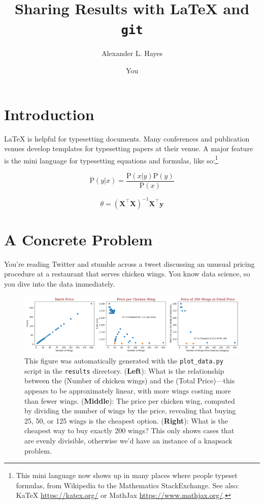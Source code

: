 \documentclass{article}
\title{Sharing Results with \LaTeX{} and \texttt{git}}
\author{Alexander L. Hayes \and You}
\date{}
\begin{document}
\maketitle

\section{Introduction}

\LaTeX{} is helpful for typesetting documents. Many conferences and
publication venues develop templates for typesetting papers at their
venue. A major feature is the mini language for typesetting
equations and formulas, like so:\footnote{This mini language now
shows up in many places where people typeset formulas, from Wikipedia to the
Mathematics StackExchange. See also: KaTeX \url{https://katex.org/}
or MathJax \url{https://www.mathjax.org/}.}

$$\mathrm{P}(y | x) = \frac{\mathrm{P}(x | y)\mathrm{P}(y)}{\mathrm{P}(x)}$$

$$\theta = (\mathbf{X}^{\top}\mathbf{X})^{-1} \mathbf{X}^{\top} \mathbf{y}$$

\section{A Concrete Problem}

You're reading Twitter and stumble across a tweet discussing an unusual pricing
procedure at a restaurant that serves chicken wings. You know data science,
so you dive into the data immediately.

\begin{figure}[h]
    \includegraphics[width=\textwidth]{chicken_wing_plots.png}
    \caption{This figure was automatically generated with the
    \texttt{plot\_data.py} script in the \texttt{results} directory.
    (\textbf{Left}): What is the relationship between the (Number of
    chicken wings) and the (Total Price)---this appears to be
    approximately linear, with more wings costing more than fewer wings.
    (\textbf{Middle}): The price per chicken wing, computed by dividing
    the number of wings by the price, revealing that buying 25, 50, or
    125 wings is the cheapest option.
    (\textbf{Right}): What is the cheapest way to buy exactly 200 wings?
    This only shows cases that are evenly divisible,
    otherwise we'd have an instance of a knapsack problem.~\citep{wiki:Knapsack_problem}}
\end{figure}



\end{document}
